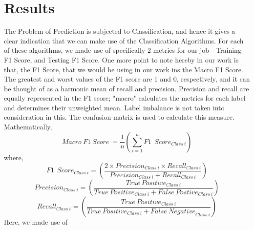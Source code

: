 \documentclass[runningheads]{llncs}
\begin{document}
\section{Results}
The Problem of Prediction is subjected to Classification, and hence it gives a clear indication that we can make use of the Classification Algorithms. For each of these algorithms, we made use of specifically 2 metrics for our job - Training F1 Score, and Testing F1 Score. One more point to note hereby in our work is that, the F1 Score, that we would be using in our work ins the Macro F1 Score. The greatest and worst values of the F1 score are 1 and 0, respectively, and it can be thought of as a harmonic mean of recall and precision. Precision and recall are equally represented in the F1 score; "macro" calculates the metrics for each label and determines their unweighted mean. Label imbalance is not taken into consideration in this. The confusion matrix is used to calculate this measure. Mathematically, 
\begin{equation*}
Macro\ F1\ Score\ =\frac{1}{n}\left(\sum_{i=1}^{n}{F1\ \ Score}_{Class\ i}\right)
\end{equation*}
where, 
\begin{equation*}
{F1\ \ Score}_{Class\ i}=\left(\frac{2\times{Precision}_{Class\ i}\times{Recall}_{Class\ i}}{{Precision}_{Class\ i}+{Recall}_{Class\ i}}\right)
\end{equation*}
\begin{equation*}
{Precision}_{Class\ i}=\left(\frac{{True\ Positive}_{Class\ i}}{{True\ Positive}_{Class\ i}+{False\ Postive}_{Class\ i}}\right)
\end{equation*}
\begin{equation*}
{Recall}_{Class\ i}=\left(\frac{{True\ Positive}_{Class\ i}}{{True\ Positive}_{Class\ i}+{False\ Negative}_{Class\ i}}\right)
\end{equation*}
Here, we made use of 
\end{document}
